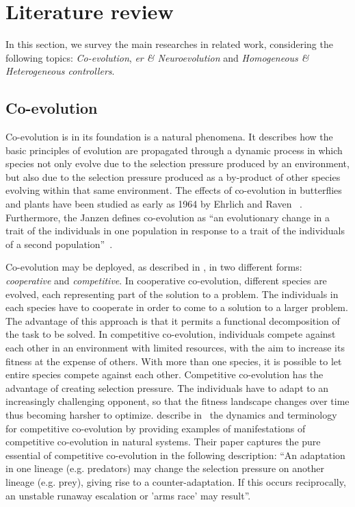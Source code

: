 \documentclass[conference]{IEEEtran}
\begin{document}
\section{Literature review}
\label{sec:lit_review}
In this section, we survey the main researches in related work, considering the following topics: \textit{Co-evolution}, \textit{\acrlong{er} \& Neuroevolution} and \textit{Homogeneous \& Heterogeneous controllers}.
 
\subsection{Co-evolution}
Co-evolution is in its foundation is a natural phenomena.
It describes how the basic principles of evolution are propagated through a dynamic process in which species not only evolve due to the selection pressure produced by an environment, but also due to the selection pressure produced as a by-product of other species evolving within that same environment.
The effects of co-evolution in butterflies and plants have been studied as early as 1964 by Ehrlich and Raven ~\cite{ehrlich1964butterflies}.
Furthermore, the Janzen defines co-evolution as ``an evolutionary change in a trait of the individuals in one population in response to a trait of the individuals of a second population''~\cite{janzen1980coevolution}. 

Co-evolution may be deployed, as described in \cite{eiben2003introduction}, in two different forms: \textit{cooperative} and \textit{competitive}.
In cooperative co-evolution, different species are evolved, each representing part of the solution to a problem.
The individuals in each species have to cooperate in order to come to a solution to a larger problem.
The advantage of this approach is that it permits a functional decomposition of the task to be solved.
In competitive co-evolution, individuals compete against each other in an environment with limited resources, with the aim to increase its fitness at the expense of others.
With more than one species, it is possible to let entire species compete against each other.
Competitive co-evolution has the advantage of creating selection pressure.
The individuals have to adapt to an increasingly challenging opponent, so that the fitness landscape changes over time thus becoming harsher to optimize.
\citeauthor{dawkins1979arms} describe in~\cite{dawkins1979arms} the dynamics and terminology for competitive co-evolution by providing examples of manifestations of competitive co-evolution in natural systems.
Their paper captures the pure essential of competitive co-evolution in the following description: ``An adaptation in one lineage (e.g. predators) may change the selection pressure on another lineage (e.g. prey), giving rise to a counter-adaptation. If this occurs reciprocally, an unstable runaway escalation or 'arms race' may result''.
\end{document}
